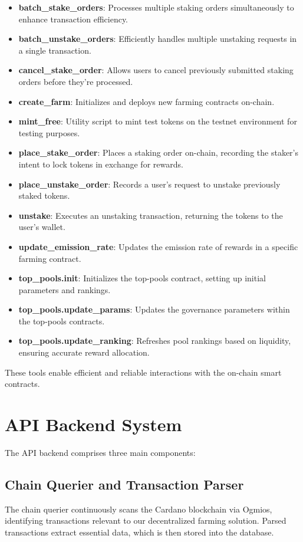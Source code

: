 \documentclass{article}
\begin{document}
\begin{itemize}
    \item \textbf{batch\_stake\_orders}: Processes multiple staking orders simultaneously to enhance transaction efficiency.
    \item \textbf{batch\_unstake\_orders}: Efficiently handles multiple unstaking requests in a single transaction.
    \item \textbf{cancel\_stake\_order}: Allows users to cancel previously submitted staking orders before they're processed.
    \item \textbf{create\_farm}: Initializes and deploys new farming contracts on-chain.
    \item \textbf{mint\_free}: Utility script to mint test tokens on the testnet environment for testing purposes.
    \item \textbf{place\_stake\_order}: Places a staking order on-chain, recording the staker's intent to lock tokens in exchange for rewards.
    \item \textbf{place\_unstake\_order}: Records a user's request to unstake previously staked tokens.
    \item \textbf{unstake}: Executes an unstaking transaction, returning the tokens to the user's wallet.
    \item \textbf{update\_emission\_rate}: Updates the emission rate of rewards in a specific farming contract.
    \item \textbf{top\_pools.init}: Initializes the top-pools contract, setting up initial parameters and rankings.
    \item \textbf{top\_pools.update\_params}: Updates the governance parameters within the top-pools contracts.
    \item \textbf{top\_pools.update\_ranking}: Refreshes pool rankings based on liquidity, ensuring accurate reward allocation.
\end{itemize}

These tools enable efficient and reliable interactions with the on-chain smart contracts.

\section{API Backend System}

The API backend comprises three main components:

\subsection{Chain Querier and Transaction Parser}
The chain querier continuously scans the Cardano blockchain via Ogmios, identifying transactions relevant to our decentralized farming solution. Parsed transactions extract essential data, which is then stored into the database.
\end{document}
